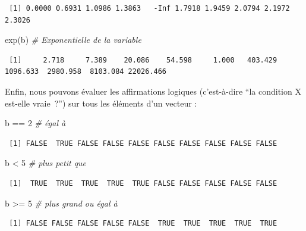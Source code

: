 \documentclass[
  12pt,
]{book}
\newenvironment{Shaded}{\begin{snugshade}}{\end{snugshade}}
\newcommand{\CommentTok}[1]{\textcolor[rgb]{0.56,0.35,0.01}{\textit{#1}}}
\newcommand{\DecValTok}[1]{\textcolor[rgb]{0.00,0.00,0.81}{#1}}
\newcommand{\FunctionTok}[1]{\textcolor[rgb]{0.00,0.00,0.00}{#1}}
\newcommand{\NormalTok}[1]{#1}
\newcommand{\SpecialCharTok}[1]{\textcolor[rgb]{0.00,0.00,0.00}{#1}}
\begin{document}
\begin{verbatim}
 [1] 0.0000 0.6931 1.0986 1.3863   -Inf 1.7918 1.9459 2.0794 2.1972 2.3026
\end{verbatim}

\begin{Shaded}
\begin{Highlighting}[]
\FunctionTok{exp}\NormalTok{(b) }\CommentTok{\# Exponentielle de la variable}
\end{Highlighting}
\end{Shaded}

\begin{verbatim}
 [1]     2.718     7.389    20.086    54.598     1.000   403.429  1096.633  2980.958  8103.084 22026.466
\end{verbatim}

Enfin, nous pouvons évaluer les affirmations logiques (c'est-à-dire ``la condition X est-elle vraie~?'') sur tous les éléments d'un vecteur :

\begin{Shaded}
\begin{Highlighting}[]
\NormalTok{b }\SpecialCharTok{==} \DecValTok{2} \CommentTok{\# égal à}
\end{Highlighting}
\end{Shaded}

\begin{verbatim}
 [1] FALSE  TRUE FALSE FALSE FALSE FALSE FALSE FALSE FALSE FALSE
\end{verbatim}

\begin{Shaded}
\begin{Highlighting}[]
\NormalTok{b }\SpecialCharTok{\textless{}} \DecValTok{5} \CommentTok{\# plus petit que}
\end{Highlighting}
\end{Shaded}

\begin{verbatim}
 [1]  TRUE  TRUE  TRUE  TRUE  TRUE FALSE FALSE FALSE FALSE FALSE
\end{verbatim}

\begin{Shaded}
\begin{Highlighting}[]
\NormalTok{b }\SpecialCharTok{\textgreater{}=} \DecValTok{5} \CommentTok{\# plus grand ou égal à}
\end{Highlighting}
\end{Shaded}

\begin{verbatim}
 [1] FALSE FALSE FALSE FALSE FALSE  TRUE  TRUE  TRUE  TRUE  TRUE
\end{verbatim}
\end{document}
